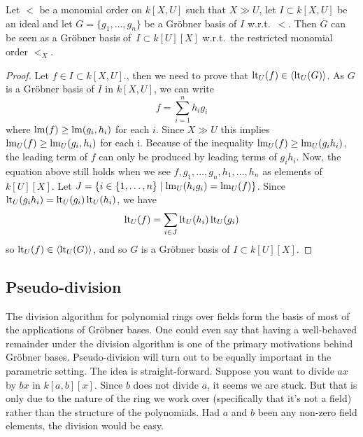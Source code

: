 \begin{lemma}\label{lem:block_order}
  Let $<$ be a monomial order on $k[X, U]$ such that $X \gg U$, let $I \subset k[X, U]$ be an ideal and let $G = \{g_{1}, \dots, g_{n}\}$ be a Gröbner basis of $I$ w.r.t.\ $<$. Then $G$ can be seen as a Gröbner basis of $\,I \subset k[U][X]$ w.r.t.\ the restricted monomial order $<_{X}$.
\end{lemma}
\begin{proof}
  Let $f \in I \subset k[X, U]$., then we need to prove that $\operatorname{lt}_{U}(f) \in \langle \operatorname{lt}_{U}(G) \rangle$. As $G$ is a Gröbner basis of $I$ in $k[X, U]$, we can write
  \[ f = \sum_{i=1}^{n} h_{i} g_{i} \]
  where $\operatorname{lm}(f) \geq \operatorname{lm}(g_{i}, h_{i})$ for each $i$. Since $X \gg U$ this implies $\operatorname{lm}_{U}(f) \geq \operatorname{lm}_{U}(g_{i}, h_{i})$ for each i. Because of the inequality $\operatorname{lm}_{U}(f) \geq \operatorname{lm}_{U}(g_{i} h_{i})$, the leading term of $f$ can only be produced by leading terms of $g_{i}h_{i}$. Now, the equation above still holds when we see $f, g_{1}, \dots, g_{n}, h_{1}, \dots, h_{n}$ as elements of $k[U][X]$. Let $J = \{i \in \{1, \dots, n\} \mid \operatorname{lm}_{U}(h_{i} g_{i}) = \operatorname{lm}_{U}(f)\}$. Since $\operatorname{lt}_{U}(g_{i} h_{i}) = \operatorname{lt}_{U}(g_{i})\operatorname{lt}_{U}(h_{i})$, we have
  \[\operatorname{lt}_{U}(f) = \sum_{i \in J} \operatorname{lt}_{U}(h_{i}) \operatorname{lt}_{U}(g_{i})\]
  so $\operatorname{lt}_{U}(f) \in \langle \operatorname{lt}_{U}(G) \rangle$, and so $G$ is a Gröbner basis of $I \subset k[U][X]$.
\end{proof}











\subsection{Pseudo-division}\label{sec:ps_div}
The division algorithm for polynomial rings over fields form the basis of most of the applications of Gröbner bases. One could even say that having a well-behaved remainder under the division algorithm is one of the primary motivations behind Gröbner bases. Pseudo-division will turn out to be equally important in the parametric setting. The idea is straight-forward. Suppose you want to divide $ax$ by $bx$ in $k[a, b][x]$. Since $b$ does not divide $a$, it seems we are stuck. But that is only due to the nature of the ring we work over (specifically that it's not a field) rather than the structure of the polynomials. Had $a$ and $b$ been any non-zero field elements, the division would be easy.


